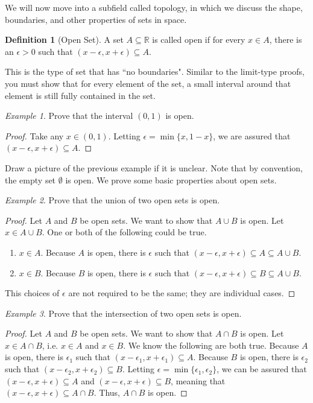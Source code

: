 \documentclass[11pt]{article}
\newcommand{\R}{\ensuremath{\mathbb R}}
\newcommand{\e}{\epsilon}
\newcommand{\sse}{\subseteq}
\theoremstyle{plain}
\theoremstyle{definition}
\newtheorem{defi}{Definition}[section]
\theoremstyle{remark}
\newtheorem{exm}{Example}[section]
\begin{document}
We will now move into a subfield called topology, in which we discuss the shape, boundaries, and other properties of sets in space.
\begin{defi}[Open Set]
    A set $A \sse \R$ is called open if for every $x \in A$, there is an $\e > 0$ such that $(x - \e, x + \e) \sse A$.
\end{defi}
This is the type of set that has ``no boundaries". Similar to the limit-type proofs, you must show that for every element of the set, a small interval around that element is still fully contained in the set.
\begin{exm}
    Prove that the interval $(0, 1)$ is open.
\end{exm}
\begin{proof}
    Take any $x \in (0, 1)$. Letting $\e = \min\{x, 1 - x\}$, we are assured that $(x - \e, x + \e) \sse A$.
\end{proof}
Draw a picture of the previous example if it is unclear. Note that by convention, the empty set $\emptyset$ is open. We prove some basic properties about open sets.
\begin{exm}
    Prove that the union of two open sets is open.
\end{exm}
\begin{proof}
    Let $A$ and $B$ be open sets. We want to show that $A \cup B$ is open. Let $x \in A \cup B$. One or both of the following could be true.
    \begin{enumerate}
        \item $x \in A$. Because $A$ is open, there is $\e$ such that $(x - \e, x + \e) \sse A \sse A \cup B$.
        \item $x \in B$. Because $B$ is open, there is $\e$ such that $(x - \e, x + \e) \sse B \sse A \cup B$.
    \end{enumerate}
    This choices of $\e$ are not required to be the same; they are individual cases.
\end{proof}
\begin{exm}
    Prove that the intersection of two open sets is open.
\end{exm}
\begin{proof}
    Let $A$ and $B$ be open sets. We want to show that $A \cap B$ is open. Let $x \in A \cap B$, i.e. $x \in A$ and $x \in B$. We know the following are both true. Because $A$ is open, there is $\e_1$ such that $(x - \e_1, x + \e_1) \sse A$. Because $B$ is open, there is $\e_2$ such that $(x - \e_2, x + \e_2) \sse B$. Letting $\e = \min\{\e_1, \e_2\}$, we can be assured that $(x - \e, x + \e) \sse A$ and $(x - \e, x + \e) \sse B$, meaning that $(x - \e, x + \e) \sse A \cap B$. Thus, $A \cap B$ is open.
\end{proof}
\end{document}
